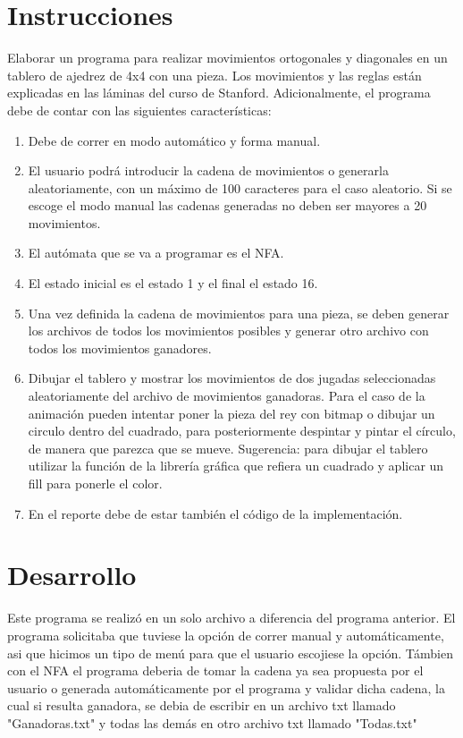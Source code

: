 \documentclass{article}
\begin{document}
	\section*{Instrucciones}
	Elaborar un programa para realizar movimientos ortogonales y diagonales en un tablero de ajedrez de 4x4 con una pieza. Los movimientos y las reglas están explicadas en las láminas del curso de Stanford.
	Adicionalmente, el programa debe de contar con las siguientes características:
	\begin{enumerate}
		\item Debe de correr en modo automático y forma manual.	
		\item El usuario podrá introducir la cadena de movimientos o generarla aleatoriamente, con un máximo de 100 caracteres para el caso aleatorio. Si se escoge el modo manual las cadenas generadas no deben ser mayores a 20 movimientos.
		\item El autómata que se va a programar es el NFA.
		\item El estado inicial es el estado 1 y el final el estado 16.
		\item Una vez definida la cadena de movimientos para una pieza, se deben generar los archivos de todos los movimientos posibles y generar otro archivo con todos los movimientos ganadores.
		\item Dibujar el tablero y mostrar los movimientos de dos jugadas seleccionadas aleatoriamente del archivo de movimientos ganadoras. Para el caso de la animación pueden intentar poner la pieza del rey con bitmap o dibujar un circulo dentro del cuadrado, para posteriormente despintar y pintar el círculo, de manera que parezca que se mueve. Sugerencia: para dibujar el tablero utilizar la función de la librería gráfica que refiera un cuadrado y aplicar un fill para ponerle el color.
		\item En el reporte debe de estar también el código de la implementación.
	\end{enumerate}
	\section*{Desarrollo}
	Este programa se realizó en un solo archivo a diferencia del programa anterior. El programa solicitaba que tuviese la opción de correr manual y automáticamente, asi que hicimos un tipo de menú para que el usuario escojiese la opción.
	Támbien con el NFA el programa deberia de tomar la cadena ya sea propuesta por el usuario o generada automáticamente por el programa y validar dicha cadena, la cual si resulta ganadora, se debia de escribir en un archivo txt llamado "Ganadoras.txt" y todas las demás en otro archivo txt llamado "Todas.txt"
\end{document}
